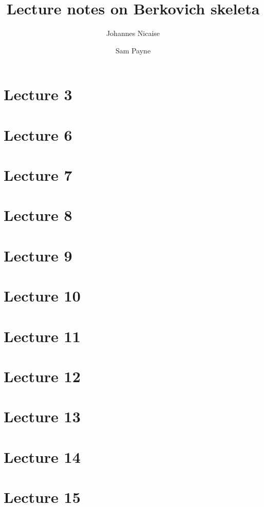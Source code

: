 \documentclass[10pt,a4paper]{article}
\title{Lecture notes on Berkovich skeleta}
\author{Johannes Nicaise \and Sam Payne}
\numberwithin{equation}{section}
\begin{document}
\maketitle




\section{Lecture 3}




\section{Lecture 6}
\section{Lecture 7}
\section{Lecture 8}
\section{Lecture 9}
\section{Lecture 10}
\section{Lecture 11}
\section{Lecture 12}
\section{Lecture 13}
\section{Lecture 14}
\section{Lecture 15}
\end{document}
